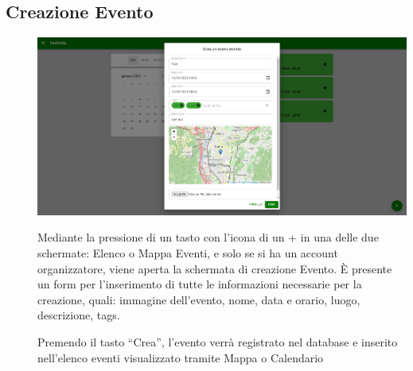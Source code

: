 \documentclass{article}
\begin{document}
\subsection{Creazione Evento}
\begin{description}
    \item[] \begin{center}
            \includegraphics[scale=0.3]{Creazione_Evento.png}
        \end{center}
    \item[] Mediante la pressione di un tasto con l'icona di un + in una delle due schermate: Elenco o Mappa Eventi, e solo se si ha un account organizzatore, viene aperta la schermata di creazione Evento. È presente un form per l'inserimento di tutte le informazioni necessarie per la creazione, quali: immagine dell'evento, nome, data e orario, luogo, descrizione, tags.
    \item[] Premendo il tasto “Crea”, l'evento verrà registrato nel database e inserito nell'elenco eventi visualizzato tramite Mappa o Calendario
\end{description}
\clearpage
\end{document}
